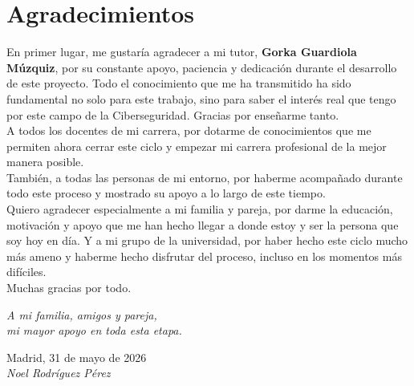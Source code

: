 \cleardoublepage

\chapter*{Agradecimientos}

En primer lugar, me gustaría agradecer a mi tutor, \textbf{Gorka Guardiola Múzquiz}, por su constante apoyo, paciencia y dedicación durante el desarrollo de este proyecto.
Todo el conocimiento que me ha transmitido ha sido fundamental no solo para este trabajo, sino para saber el interés real que tengo por este campo de la Ciberseguridad.
Gracias por enseñarme tanto.\\

A todos los docentes de mi carrera, por dotarme de conocimientos que me permiten ahora cerrar este ciclo y empezar mi carrera profesional de la mejor manera posible.\\

También, a todas las personas de mi entorno, por haberme acompañado durante todo este proceso y mostrado su apoyo a lo largo de este tiempo.\\

Quiero agradecer especialmente a mi familia y pareja, por darme la educación, motivación y apoyo que me han hecho llegar a donde estoy y ser la persona que soy hoy en día.
Y a mi grupo de la universidad, por haber hecho este ciclo mucho más ameno y haberme hecho disfrutar del proceso, incluso en los momentos más difíciles.\\

Muchas gracias por todo.

\begin{flushright}
		\vspace{3.0 cm}
		\emph{A mi familia, amigos y pareja,\\
      mi mayor apoyo en toda esta etapa.}\\
		\par
		\vspace{0.5 cm}
		Madrid, 31 de mayo de 2026\\ %
		\emph{Noel Rodríguez Pérez}
\end{flushright}

\thispagestyle{empty}

